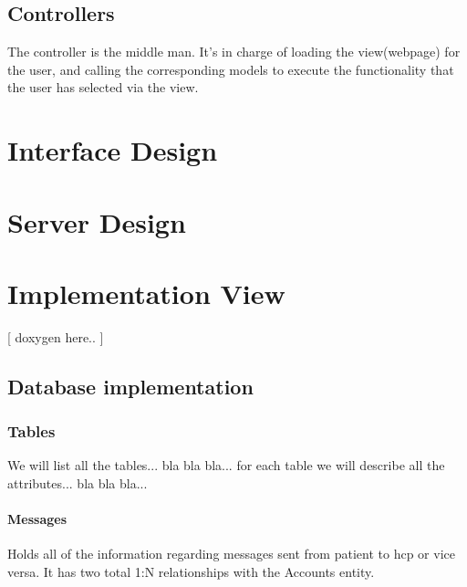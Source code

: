 \documentclass[12pt]{report}
\begin{document}
\section{Controllers}
The controller is the middle man. It's in charge of loading the view(webpage) for the user, and calling the corresponding models to execute the functionality that the user has selected via the view. 

\chapter{Interface Design}

\chapter{Server Design}

\chapter{Implementation View}
[ doxygen here.. ]

\section{Database implementation}
\subsection{Tables}
We will list all the tables... bla bla bla... for each table we will describe all the attributes... bla bla bla...

\subsubsection{Messages}
Holds all of the information regarding messages sent from patient to hcp or vice versa. It has two total 1:N relationships with the Accounts entity.
\end{document}

